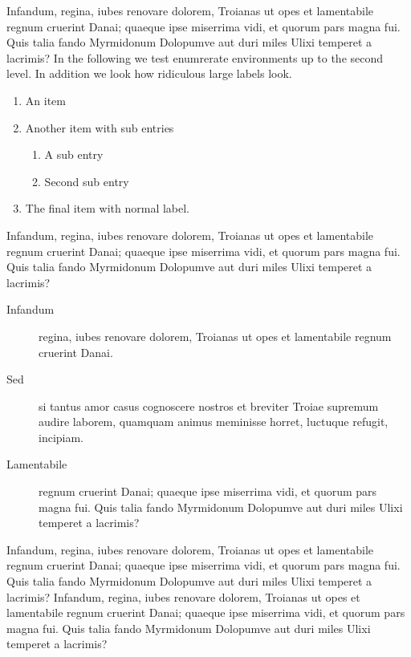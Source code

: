 \documentclass[
    ,final            %
  ]
  {aipproc}
\begin{document}
Infandum, regina, iubes renovare dolorem, Troianas ut opes et
lamentabile regnum cruerint Danai; quaeque ipse miserrima vidi, et
quorum pars magna fui. Quis talia fando Myrmidonum Dolopumve aut duri
miles Ulixi temperet a \cite{EVH:Office} lacrimis? In the following we
test enumrerate environments up to the second level. In addition we
look how ridiculous large labels look.
\begin{enumerate}
\item
  An item \cite{Liang:1983}
\item
  Another item with sub entries
  \begin{enumerate}
  \item
   A sub entry \cite{Wang}
  \item
   Second sub entry
  \end{enumerate}
\item
  The final item with normal label.
\end{enumerate}
Infandum, regina, iubes renovare dolorem, Troianas ut opes et
lamentabile regnum cruerint Danai; quaeque ipse miserrima vidi, et
quorum pars magna fui. Quis talia  fando Myrmidonum Dolopumve aut duri
miles Ulixi temperet a lacrimis?
\begin{description}
\item[Infandum]
 regina, iubes renovare dolorem, Troianas ut opes et lamentabile
 regnum cruerint Danai.
\item[Sed]
 si tantus amor casus cognoscere nostros et breviter Troiae supremum
 audire laborem, quamquam animus meminisse horret, luctuque refugit,
 incipiam.
\item[Lamentabile] regnum cruerint Danai; quaeque ipse miserrima vidi, et
quorum pars magna fui. Quis talia  fando Myrmidonum Dolopumve aut duri
miles Ulixi temperet a lacrimis?
\end{description}

Infandum, regina, iubes renovare dolorem, Troianas ut opes et
lamentabile regnum cruerint Danai; quaeque ipse miserrima vidi, et
quorum pars magna fui. Quis talia fando Myrmidonum Dolopumve aut duri
miles Ulixi temperet a lacrimis?
Infandum, regina, iubes renovare dolorem, Troianas ut opes et
lamentabile regnum cruerint Danai; quaeque ipse miserrima vidi, et
quorum pars magna fui. Quis talia fando Myrmidonum Dolopumve aut duri
miles Ulixi temperet a lacrimis?
\end{document}
